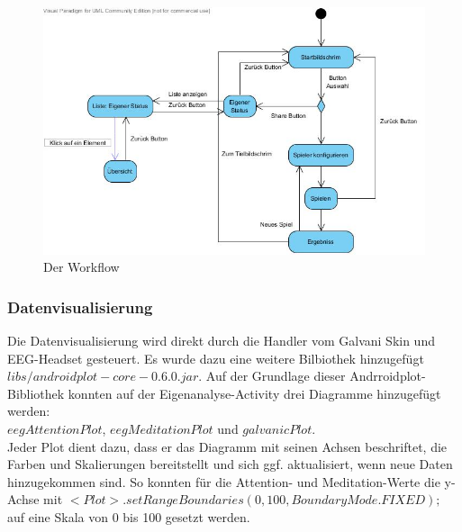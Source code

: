 	\begin{figure}[hbtp]
	\centering
	\includegraphics[scale=0.5]{img/Workflow.jpg}
	\caption{Der Workflow}
	\label{fig:Workflow}
	\end{figure}
	
	\subsubsection{Datenvisualisierung}\label{datenvisualisierung}

Die Datenvisualisierung wird direkt durch die Handler vom Galvani Skin und EEG-Headset gesteuert. 
Es wurde dazu eine weitere Bilbiothek hinzugefügt\\ $libs/androidplot-core-0.6.0.jar$. 
Auf der Grundlage dieser Andrroidplot-Bibliothek konnten auf der Eigenanalyse-Activity drei Diagramme hinzugefügt werden: \\$eegAttentionPlot$, $eegMeditationPlot$ und $galvanicPlot$.\\
Jeder Plot dient dazu, dass er das Diagramm mit seinen Achsen beschriftet, die Farben und Skalierungen bereitstellt und sich ggf. aktualisiert, wenn neue Daten hinzugekommen sind.
So konnten für die Attention- und Meditation-Werte die y-Achse mit $<Plot>.setRangeBoundaries(0, 100, BoundaryMode.FIXED);$ auf eine Skala von 0 bis 100 gesetzt werden.

